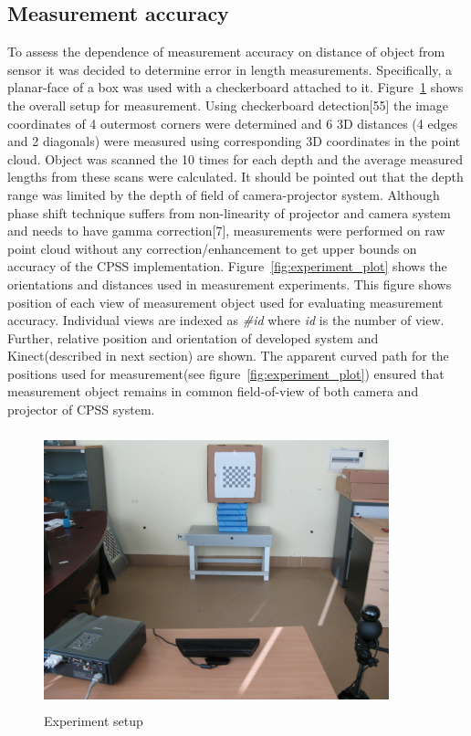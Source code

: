 \subsection{Measurement accuracy}
\label{experiment:accuracy} 
To assess the dependence of measurement accuracy on distance of object from sensor it was decided to determine error in length measurements. Specifically, a planar-face of a box was used with a checkerboard attached to it. Figure~\ref{fig:experiment_setup} shows the overall setup for measurement. Using checkerboard detection[55] the image coordinates of 4 outermost corners were determined and 6 3D distances (4 edges and 2 diagonals) were measured using corresponding 3D coordinates in the point cloud. Object was scanned the 10 times for each depth and the average measured lengths from these scans were calculated. It should be pointed out that the depth range was limited by the depth of field of camera-projector system. Although phase shift technique suffers from non-linearity of projector and camera  system and needs to have gamma correction[7], measurements were performed on raw point cloud without any correction/enhancement to get upper bounds on accuracy of the CPSS implementation. Figure~\ref{fig:experiment_plot} shows the orientations and distances used in measurement experiments. This figure shows position of each view of measurement object used for evaluating measurement accuracy. Individual views are indexed as \textit{\#id} where \textit{id} is the number of view. Further, relative position and orientation of developed system and Kinect(described in next section) are shown. The apparent curved path for the positions used for measurement(see figure~\ref{fig:experiment_plot}) ensured that measurement object remains in common field-of-view of both camera and projector of CPSS system. 

\begin{figure}[ht]
\centering
\includegraphics[width=10cm,height=8cm]{../img_source/setup.jpg}
\caption{Experiment setup}
\label{fig:experiment_setup}
\end{figure}


